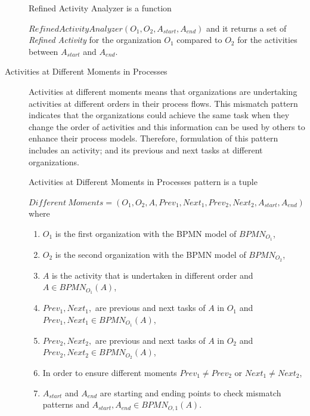 \begin{description}
		\theoremstyle{definition}
		\begin{definition}
		Refined Activity Analyzer is a function 

		$RefinedActivityAnalyzer(O_{1}, O_{2}, A_{start}, A_{end})$ and it returns a set of \textit{Refined Activity} for the organization $O_{1}$ compared to $O_{2}$ for the activities between $A_{start}$ and $A_{end}$.
		\end{definition}

   \item[Activities at Different Moments in Processes] Activities at different moments means that organizations are undertaking activities at different orders in their process flows. This mismatch pattern indicates that the organizations could achieve the same task when they change the order of activities and this information can be used by others to enhance their process models. Therefore, formulation of this pattern includes an activity; and its previous and next tasks at different organizations.
		\theoremstyle{definition}
		\begin{definition}
		Activities at Different Moments in Processes pattern is a tuple 

		${Different\ Moments} = (O_{1}, O_{2}, A, Prev_{1}, Next_{1},Prev_{2}, Next_{2}, A_{start}, A_{end}) $ where 
		\begin{enumerate}
		  \item $O_{1}$ is the first organization with the BPMN model of $BPMN_{{O}_{1}}$,
		  \item $O_{2}$ is the second organization with the BPMN model of $BPMN_{{O}_{2}}$,
		  \item $A$ is the activity that is undertaken in different order and $A \in BPMN_{{O}_{1}}(A)$,
		  \item $Prev_{1}, Next_{1},$ are previous and next tasks of $A$ in $O_{1}$ and  $Prev_{1}, Next_{1} \in  BPMN_{{O}_{1}}(A)$,
  		  \item $Prev_{2}, Next_{2},$ are previous and next tasks of $A$ in $O_{2}$ and  $Prev_{2}, Next_{2} \in  BPMN_{{O}_{2}}(A)$,
  		  \item In order to ensure different moments $Prev_{1} \neq Prev_{2}$ or $Next_{1} \neq Next_{2}$,
 		  \item $A_{start}$ and $A_{end}$ are starting and ending points to check mismatch patterns and $A_{start}, A_{end} \in BPMN_{O,1}(A)$.
		\end{enumerate}
		\end{definition}


\end{description}
